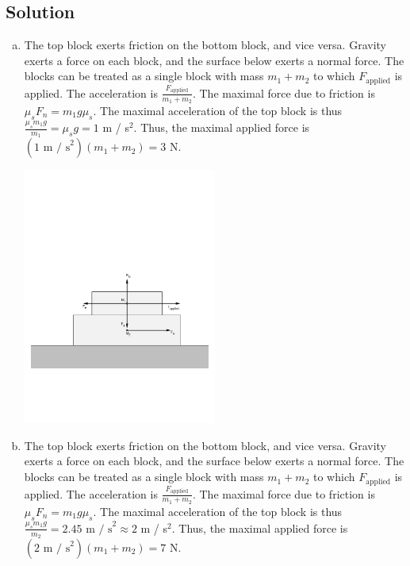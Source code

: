 \documentclass[solutions]{esg8012pset}
\begin{document}
\subsection*{Solution}
  \begin{enumerate}[a)]
    \item The top block exerts friction on the bottom block, and vice versa.  Gravity exerts a force on each block, and the surface below exerts a normal force.  The blocks can be treated as a single block with mass $m_1 + m_2$ to which $F_{\text{applied}}$ is applied.  The acceleration is $\frac{F_{\text{applied}}}{m_1 + m_2}$.  The maximal force due to friction is $\mu_s F_n = m_1 g \mu_s$.  The maximal acceleration of the top block is thus $\frac{\mu_s m_1 g}{m_1} = \mu_s g = 1$ m / s$^2$.  Thus, the maximal applied force is $(1\text{ m / s}^2)(m_1 + m_2) = 3$ N.
      \par\begin{center}\includegraphics[width=0.5\textwidth]{2009-09-25_Diagram_2}\end{center}
    \item The top block exerts friction on the bottom block, and vice versa.  Gravity exerts a force on each block, and the surface below exerts a normal force.  The blocks can be treated as a single block with mass $m_1 + m_2$ to which $F_{\text{applied}}$ is applied.  The acceleration is $\frac{F_{\text{applied}}}{m_1 + m_2}$.  The maximal force due to friction is $\mu_s F_n = m_1 g \mu_s$.  The maximal acceleration of the top block is thus $\frac{\mu_s m_1 g}{m_2} = 2.45\text{ m / s}^2\approx 2$ m / s$^2$.  Thus, the maximal applied force is $(2\text{ m / s}^2)(m_1 + m_2) = 7$ N.

\end{enumerate}
\end{document}
